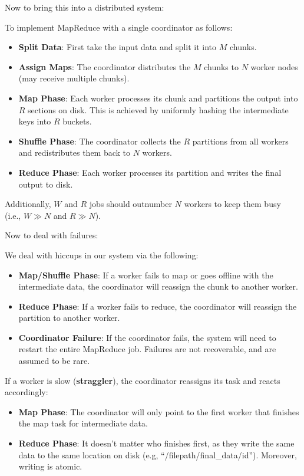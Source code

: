 \noindent
Now to bring this into a distributed system:

\begin{Def}

    To implement MapReduce with a single coordinator as follows:
    \begin{itemize}
        \item \textbf{Split Data}: First take the input data and split it into $M$ chunks.
        \item \textbf{Assign Maps}: The coordinator distributes the $M$ chunks to $N$ worker nodes (may receive multiple chunks).
        \item \textbf{Map Phase}: Each worker processes its chunk and partitions the output into $R$ sections on disk. This is 
        achieved by uniformly hashing the intermediate keys into $R$ buckets.
        \item \textbf{Shuffle Phase}: The coordinator collects the $R$ partitions from all workers and redistributes them back to $N$ workers.
        \item \textbf{Reduce Phase}: Each worker processes its partition and writes the final output to disk.
    \end{itemize}

    \noindent
    Additionally, $W$ and $R$ jobs should outnumber $N$ workers to keep them busy\\
    (i.e., $W \gg N$ and $R \gg N$).
\end{Def}

\newpage 
\noindent
Now to deal with failures:

\begin{Def}

    We deal with hiccups in our system via the following:
    \begin{itemize}
        \item \textbf{Map/Shuffle Phase}: If a worker fails to map or goes offline with the intermediate data, the coordinator will reassign the chunk to another worker.
        \item \textbf{Reduce Phase}: If a worker fails to reduce, the coordinator will reassign the partition to another worker.
        \item \textbf{Coordinator Failure}: If the coordinator fails, the system will need to restart the entire MapReduce job. Failures are not recoverable, and are assumed to be rare.
    \end{itemize}
\noindent
    If a worker is slow (\textbf{straggler}), the coordinator reassigns its task and reacts accordingly:
    \begin{itemize}
        \item \textbf{Map Phase}: The coordinator will only point to the first worker that finishes the map task for intermediate data.
        \item \textbf{Reduce Phase}: It doesn't matter who finishes first, as they write the same data to the same location on disk (e.g, ``/filepath/final\_data/id''). Moreover, writing is atomic.
    \end{itemize}
\end{Def}

